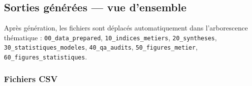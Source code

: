 \documentclass[11pt,a4paper]{article}
\begin{document}
\subsection{Sorties générées — vue d'ensemble}

\begin{infobox}
Après génération, les fichiers sont déplacés automatiquement dans l'arborescence thématique :
\texttt{00\_data\_prepared}, \texttt{10\_indices\_metiers}, \texttt{20\_syntheses},
\texttt{30\_statistiques\_modeles}, \texttt{40\_qa\_audits},
\texttt{50\_figures\_metier}, \texttt{60\_figures\_statistiques}.
\end{infobox}

\subsubsection{Fichiers CSV}
\end{document}
